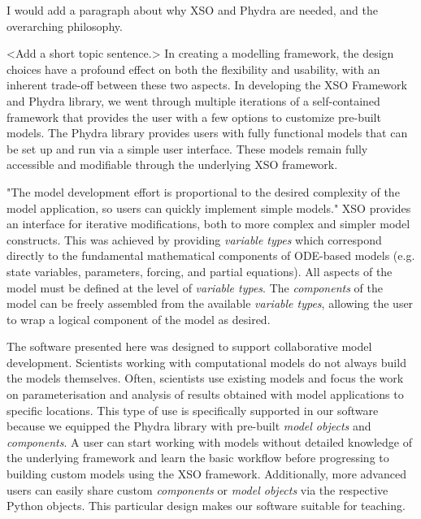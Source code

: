 \documentclass[journal abbreviation, manuscript]{copernicus}
\begin{document}
I would add a paragraph about why XSO and Phydra are needed, and the overarching philosophy. 

<Add a short topic sentence.> In creating a modelling framework, the design choices have a profound effect on both the flexibility and usability, with an inherent trade-off between these two aspects. In developing the XSO Framework and Phydra library, we went through multiple iterations of a self-contained framework that provides the user with a few options to customize pre-built models. The Phydra library provides users with fully functional models that can be set up and run via a simple user interface. These models remain fully accessible and modifiable through the underlying XSO framework.



"The model development effort is proportional to the desired complexity of the model application, so users can quickly implement simple models."
XSO provides an interface for iterative modifications, both to more complex and simpler model constructs. This was achieved by providing \textit{variable types} which correspond directly to the fundamental mathematical components of ODE-based models (e.g. state variables, parameters, forcing, and partial equations). All aspects of the model must be defined at the level of \textit{variable types}. The \textit{components} of the model can be freely assembled from the available \textit{variable types}, allowing the user to wrap a logical component of the model as desired.

The software presented here was designed to support collaborative model development. Scientists working with computational models do not always build the models themselves. Often, scientists use existing models and focus the work on parameterisation and analysis of results obtained with model applications to specific locations. This type of use is specifically supported in our software because we equipped the Phydra library with pre-built \textit{model objects} and \textit{components}. A user can start working with models without detailed knowledge of the underlying framework and learn the basic workflow before progressing to building custom models using the XSO framework. Additionally, more advanced users can easily share custom \textit{components} or \textit{model objects} via the respective Python objects. This particular design makes our software suitable for teaching. 
\end{document}
